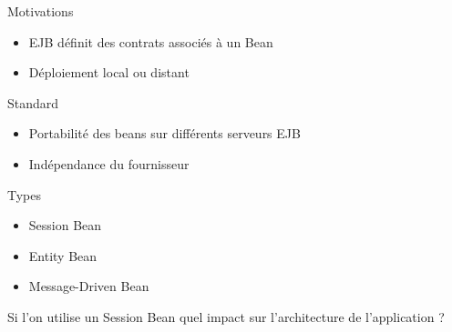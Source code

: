 \begin{frame}
  \begin{block}{Motivations}
    \begin{itemize}
      \item EJB définit des contrats associés à un Bean
      \item Déploiement local ou distant
    \end{itemize}
  \end{block}

  \begin{block}{Standard}
     \begin{itemize}
       \item Portabilité des beans sur différents serveurs EJB
       \item Indépendance du fournisseur
    \end{itemize}
  \end{block}
\end{frame}

\begin{frame}
  \begin{block}{Types}
    \begin{itemize}
      \item Session Bean
      \item Entity Bean
      \item Message-Driven Bean
    \end{itemize}
  \end{block}

  \begin{center}
    Si l'on utilise un Session Bean quel impact sur l'architecture de l'application ?
  \end{center}

\end{frame}
